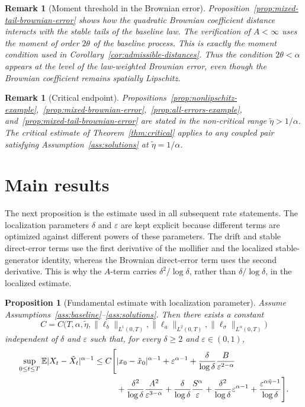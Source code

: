 \documentclass[11pt]{article}
\newtheorem{proposition}[theorem]{Proposition}
\newtheorem{remark}[theorem]{Remark}
\newcommand{\E}{\mathbb{E}}
\newcommand{\1}{\mathbf{1}}
\newcommand{\wt}{\tilde}
\newcommand{\eps}{\varepsilon}
\begin{document}
\begin{remark}[Moment threshold in the Brownian error]
Proposition~\ref{prop:mixed-tail-brownian-error} shows how the quadratic Brownian coefficient distance interacts with the stable tails of the baseline law. The verification of $A<\infty$ uses the moment of order $2\theta$ of the baseline process. This is exactly the moment condition used in Corollary~\ref{cor:admissible-distances}. Thus the condition $2\theta<\alpha$ appears at the level of the law-weighted Brownian error, even though the Brownian coefficient remains spatially Lipschitz.
\end{remark}

\begin{remark}[Critical endpoint]
Propositions~\ref{prop:nonlipschitz-example},~\ref{prop:mixed-brownian-error},~\ref{prop:all-errors-example}, and~\ref{prop:mixed-tail-brownian-error} are stated in the non-critical range $\wt\eta>1/\alpha$. The critical estimate of Theorem~\ref{thm:critical} applies to any coupled pair satisfying Assumption~\ref{ass:solutions} at $\wt\eta=1/\alpha$.
\end{remark}

\section{Main results}
\label{sec:main-results}

The next proposition is the estimate used in all subsequent rate statements. The localization parameters $\delta$ and $\eps$ are kept explicit because different terms are optimized against different powers of these parameters. The drift and stable direct-error terms use the first derivative of the mollifier and the localized stable-generator identity, whereas the Brownian direct-error term uses the second derivative. This is why the $A$-term carries $\delta^2/\log\delta$, rather than $\delta/\log\delta$, in the localized estimate.

\begin{proposition}[Fundamental estimate with localization parameter]\label{prop:fundamental-delta}
Assume Assumptions~\ref{ass:baseline}--\ref{ass:solutions}. Then there exists a constant
\[
C=C\bigl(T,\alpha,\wt\eta,\|\ell_b\|_{L^1(0,T)},\|\ell_a\|_{L^2(0,T)},\|\ell_\sigma\|_{L^\alpha(0,T)}\bigr)
\]
independent of $\delta$ and $\eps$ such that, for every $\delta\ge2$ and $\eps\in(0,1)$,
\begin{align}
\sup_{0\le t\le T}\E|X_t-\wt X_t|^{\alpha-1}
\le C\Bigg[&|x_0-\wt x_0|^{\alpha-1}
+\eps^{\alpha-1}
+\frac{\delta}{\log\delta}\frac{B}{\eps^{2-\alpha}} \notag\\
&+\frac{\delta^2}{\log\delta}\frac{A^2}{\eps^{3-\alpha}}
+\frac{\delta}{\log\delta}\frac{S^\alpha}{\eps}
+\frac{\delta^2}{\log\delta}\eps^{\alpha-1}
+\frac{\eps^{\alpha\wt\eta-1}}{\log\delta}
\Bigg]. \label{eq:fundamental-delta}
\end{align}
\end{proposition}
\end{document}
